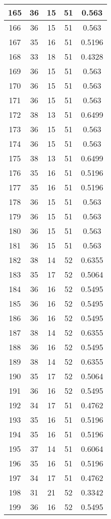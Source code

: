 \documentclass[letterpaper, 12pt]{article}
\begin{document}
\begin{longtable}{|c|c|c|c|c|}
\hline
165 & 36 & 15 & 51 & 0.563 \\
\hline
166 & 36 & 15 & 51 & 0.563 \\
\hline
167 & 35 & 16 & 51 & 0.5196 \\
\hline
168 & 33 & 18 & 51 & 0.4328 \\
\hline
169 & 36 & 15 & 51 & 0.563 \\
\hline
170 & 36 & 15 & 51 & 0.563 \\
\hline
171 & 36 & 15 & 51 & 0.563 \\
\hline
172 & 38 & 13 & 51 & 0.6499 \\
\hline
173 & 36 & 15 & 51 & 0.563 \\
\hline
174 & 36 & 15 & 51 & 0.563 \\
\hline
175 & 38 & 13 & 51 & 0.6499 \\
\hline
176 & 35 & 16 & 51 & 0.5196 \\
\hline
177 & 35 & 16 & 51 & 0.5196 \\
\hline
178 & 36 & 15 & 51 & 0.563 \\
\hline
179 & 36 & 15 & 51 & 0.563 \\
\hline
180 & 36 & 15 & 51 & 0.563 \\
\hline
181 & 36 & 15 & 51 & 0.563 \\
\hline
182 & 38 & 14 & 52 & 0.6355 \\
\hline
183 & 35 & 17 & 52 & 0.5064 \\
\hline
184 & 36 & 16 & 52 & 0.5495 \\
\hline
185 & 36 & 16 & 52 & 0.5495 \\
\hline
186 & 36 & 16 & 52 & 0.5495 \\
\hline
187 & 38 & 14 & 52 & 0.6355 \\
\hline
188 & 36 & 16 & 52 & 0.5495 \\
\hline
189 & 38 & 14 & 52 & 0.6355 \\
\hline
190 & 35 & 17 & 52 & 0.5064 \\
\hline
191 & 36 & 16 & 52 & 0.5495 \\
\hline
192 & 34 & 17 & 51 & 0.4762 \\
\hline
193 & 35 & 16 & 51 & 0.5196 \\
\hline
194 & 35 & 16 & 51 & 0.5196 \\
\hline
195 & 37 & 14 & 51 & 0.6064 \\
\hline
196 & 35 & 16 & 51 & 0.5196 \\
\hline
197 & 34 & 17 & 51 & 0.4762 \\
\hline
198 & 31 & 21 & 52 & 0.3342 \\
\hline
199 & 36 & 16 & 52 & 0.5495 \\
\hline
\end{longtable}
\end{document}
